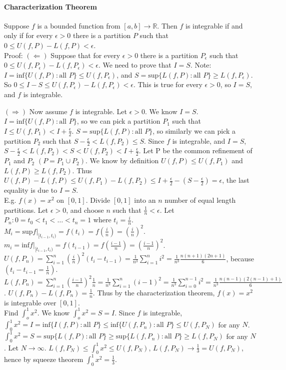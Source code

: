 \documentclass[10pt,letter]{article}
\begin{document}
\paragraph{Characterization Theorem}
Suppose $f$ is a bounded function from $[a,b]\rightarrow\mathbb{R}$. Then $f$ is integrable if and only if for every $\epsilon>0$ there is a partition $P$ such that $0\leq U(f,P)-L(f,P)<\epsilon$.\\ 
Proof: $(\Leftarrow)$ Suppose that for every $\epsilon>0$ there is a partition $P_\epsilon$ such that $0\leq U(f,P_\epsilon)-L(f,P_\epsilon)<\epsilon$. We need to prove that $I=S$. Note: $I=\text{inf}\{U(f,P):\text{all }P\}\leq U(f,P_\epsilon)$, and $S=\text{sup}\{L(f,P):\text{all }P\}\geq L(f,P_\epsilon)$. So $0\leq I-S\leq U(f,P_\epsilon)-L(f,P_\epsilon)<\epsilon$. This is true for every $\epsilon>0$, so $I=S$, and $f$ is integrable. 

$(\Rightarrow)$ Now assume $f$ is integrable. Let $\epsilon>0$. We know $I=S$.  $I=\text{inf}\{U(f,P):\text{all }P\}$, so we can pick a partition $P_1$ such that $I\leq U(f,P_1)<I+\frac{\epsilon}{2}$. $S=\text{sup}\{L(f,P):\text{all }P\}$, so similarly we can pick a partition $P_2$ such that $S-\frac{\epsilon}{2}<L(f,P_2)\leq S$. Since $f$ is integrable, and $I=S$, $S-\frac{\epsilon}{2}<L(f,P_2)<S<U(f,P_2)<I+\frac{\epsilon}{2}$. Let P be the common refinement of $P_1$ and $P_2$ $(P = P_1\cup P_2)$. We know by definition $U(f,P)\leq U(f,P_1)$ and $L(f,P)\geq L(f,P_2)$. Thus $U(f,P)-L(f,P)\leq U(f,P_1)-L(f,P_2)\leq I+\frac{\epsilon}{2}-(S-\frac{\epsilon}{2})=\epsilon$, the last equality is due to $I=S$. \\ 

E.g. $f(x)=x^2$ on $[0,1]$. Divide $[0,1]$ into an $n$ number of equal length partitions. Let $\epsilon>0$, and choose $n$ such that $\frac{1}{n}<\epsilon$. Let $P_n:0=t_0<t_1<\ldots<t_n=1$ where $t_i=\frac{i}{n}$. $M_i=\text{sup}f|_{[t_{i-1},t_i)}=f(t_i)=f(\frac{i}{n})=(\frac{i}{n})^2$. $m_i=\text{inf}f|_{[t_{i-1},t_i)}=f(t_{i-1})=f(\frac{i-1}{n})=(\frac{i-1}{n})^2$. $U(f,P_n)=\sum_{i=1}^n(\frac{i}{n})^2(t_i-t_{i-1})=\frac{1}{n^3}\sum_{i=1}^ni^2=\frac{1}{n^3}\frac{n(n+1)(2n+1)}{6}$, because $(t_i-t_{i-1}=\frac{1}{n})$. $L(f,P_n)=\sum_{i=1}^n(\frac{i-1}{n})^2\frac{1}{n}=\frac{1}{n^3}\sum_{i=1}^n(i-1)^2=\frac{1}{n^3}\sum_{i=0}^{n-1}i^2=\frac{1}{n^3}\frac{n(n-1)(2(n-1)+1)}{6}$. $U(f,P_n)-L(f,P_n) = \frac{1}{n}$. Thus by the characterization theorem, $f(x)=x^2$ is integrable over $[0,1]$.  \\ 
Find $\int_o^1x^2$. We know $\int_o^1x^2=S=I$. Since $f$ is integrable, $\int_0^1x^2=I=\text{inf}\{I(f,P): \text{all }P\}\leq\text{inf}\{U(f,P_n): \text{all }P\}\leq U(f,P_N)$ for any $N$. $\int_0^1x^2=S=\text{sup}\{L(f,P): \text{all }P\}\geq\text{sup}\{L(f,P_n): \text{all }P\}\geq L(f,P_N)$ for any $N$. Let $N\rightarrow\infty$. $L(f,P_N)\leq\int_0^1x^2\leq U(f,P_N)$, $L(f,P_N)\rightarrow\frac{1}{3}=U(f,P_N)$, hence by squeeze theorem $\int_0^1x^2=\frac{1}{3}$. 
\end{document}
